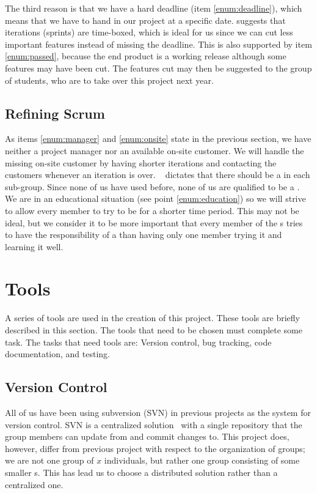 The third reason is that we have a hard deadline (item \ref{enum:deadline}), which means that we have to hand in our project at a specific date.
\Sos{} suggests that iterations (sprints) are time-boxed, which is ideal for us since we can cut less important features instead of missing the deadline.
This is also supported by item \ref{enum:passed}, because the end product is a working release although some features may have been cut.
The features cut may then be suggested to the group of students, who are to take over this project next year.


\subsection{Refining Scrum} 
\label{sub:rescrum}
As items \ref{enum:manager} and \ref{enum:onsite} state in the previous section, we have neither a project manager nor an available on-site customer.
We will handle the missing on-site customer by having shorter iterations and contacting the customers whenever an iteration is over.
\Sos{}~\cite{scrumOfScrums} dictates that there should be a \scrummaster{} in each sub-group.
Since none of us have used \scrum{} before, none of us are qualified to be a \scrummaster{}.
We are in an educational situation (see point \ref{enum:education}) so we will strive to allow every member to try to be \scrummaster{} for a shorter time period.
This may not be ideal, but we consider it to be more important that every member of the \subgroup{}s tries to have the responsibility of a \scrummaster{} than having only one member trying it and learning it well.

\begin{comment}
There is more:
*Scrum board
*The phases / meetings
**estimation
**sprint planning
*Scrum meetings
*Scrum of scrum def
*project manager problem
\end{comment}


\section{Tools}\label{subsec:tools}
A series of tools are used in the creation of this project.
These tools are briefly described in this section.
The tools that need to be chosen must complete some task. 
The tasks that need tools are: Version control, bug tracking, code documentation, and testing.

\subsection{Version Control}
All of us have been using subversion (SVN) in previous projects as the system for version control.
SVN is a centralized solution~\cite{subversion} with a single repository that the group members can update from and commit changes to.
This project does, however, differ from previous project with respect to the organization of groups; we are not one group of $x$ individuals, but rather one group consisting of some smaller \subgroup{}s.
This has lead us to choose a distributed solution rather than a centralized one.

